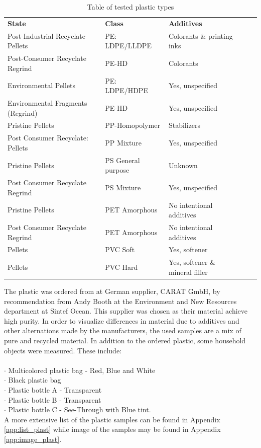 \begin{center}
\begin{table}[H]
\begin{tabular}{ |l|l|l|l|l| }
 \hline
 \textbf{State} & \textbf{Class} & \textbf{Additives}\\ 
Post-Industrial Recyclate Pellets & PE: LDPE/LLDPE & Colorants \& printing inks\\
Post-Consumer Recyclate Regrind & PE-HD & Colorants\\
Environmental Pellets & PE: LDPE/HDPE & Yes, unspecified\\
Environmental Fragments (Regrind) & PE-HD & Yes, unspecified\\
Pristine Pellets & PP-Homopolymer & Stabilizers\\
Post Consumer Recyclate: Pellets & PP Mixture & Yes, unspecified\\
Pristine Pellets & PS General purpose & Unknown\\
Post Consumer Recyclate Regrind & PS Mixture & Yes, unspecified\\ 
Pristine Pellets & PET Amorphous & No intentional additives\\
Post Consumer Recyclate Regrind & PET Amorphous & No intentional additives\\
Pellets & PVC Soft & Yes, softener\\
Pellets & PVC Hard & Yes, softener \& mineral filler\\
 \hline
\end{tabular}
\caption{Table of tested plastic types}
\label{tab:tested:plastic}
\end{table}
\end{center}
\noindent
The plastic was ordered from at German supplier, CARAT GmbH, by recommendation from Andy Booth at the Environment and New Resources department at Sintef Ocean. This supplier was chosen as their material achieve high purity. In order to visualize differences in material due to additives and other alternations made by the manufacturers, the used samples are a mix of pure and recycled material. In addition to the ordered plastic, some household objects were measured. These include:
\\\\
\noindent
$\cdot$ Multicolored plastic bag - Red, Blue and White\\
$\cdot$ Black plastic bag\\
$\cdot$ Plastic bottle A - Transparent\\
$\cdot$ Plastic bottle B - Transparent\\
$\cdot$ Plastic bottle C - See-Through with Blue tint.
\\
A more extensive list of the plastic samples can be found in Appendix \autoref{app:list_plast} while image of the samples may be found in Appendix \autoref{app:image_plast}.


